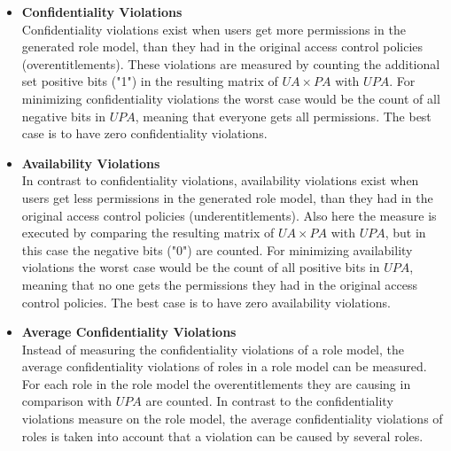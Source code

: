     \begin{itemize}
    	\item \textbf{Confidentiality Violations}\\
    	Confidentiality violations exist when users get more permissions in the generated role model, than they had in the original access control policies (overentitlements). These violations are measured by counting the additional set positive bits ("1") in the resulting matrix of $UA \times PA$ with $UPA$. 
    	For minimizing confidentiality violations the worst case would be the count of all negative bits in $UPA$, meaning that everyone gets all permissions. The best case is to have zero confidentiality violations.
    	
    	\item \textbf{Availability Violations}\\
    	In contrast to confidentiality violations, availability violations exist when users get less permissions in the generated role model, than they had in the original access control policies (underentitlements). Also here the measure is executed by comparing the resulting matrix of $UA \times PA$ with $UPA$, but in this case the negative bits ("0") are counted.
    	For minimizing availability violations the worst case would be the count of all positive bits in $UPA$, meaning that no one gets the permissions they had in the original access control policies. The best case is to have zero availability violations.
    	
    	\iffalse \item \textbf{Confidentiality and Availability Violations}\\
    	One fitness function is sum of the confidentiality violations and availability violations. Before the values are added, they get normalized. The worst case of availability violations is the count of all positive bits in $UPA$, meaning that no one gets the permissions they had in the original access control policies. The worst case of confidentiality violations is the count of all negative bits in $UPA$, meaning that everyone gets all permissions. For both violation counts 0 is the best case. With the normalization the measures can be weighted, e.g. if availability violations are more acceptable than confidentiality violations, the weight for the later can be bigger.\fi
    	
    	\item \textbf{Average Confidentiality Violations}\\
    	Instead of measuring the confidentiality violations of a role model, the average confidentiality violations of roles in a role model can be measured. For each role in the role model the overentitlements they are causing in comparison with $UPA$ are counted. In contrast to the confidentiality violations measure on the role model, the average confidentiality violations of roles is taken into account that a violation can be caused by several roles.
    	

\end{itemize}
